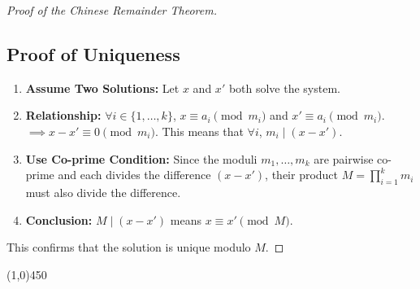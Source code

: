 \begin{proof}[Proof of the Chinese Remainder Theorem]
\subsection*{Proof of Uniqueness}
\begin{enumerate}
    \item \textbf{Assume Two Solutions:} Let $x$ and $x'$ both solve the system.
    \item \textbf{Relationship:} $\forall i \in \{1, \dots, k\}$, $x \equiv a_i \pmod{m_i}$ and $x' \equiv a_i \pmod{m_i}$. $\implies x - x' \equiv 0 \pmod{m_i}$.
    This means that $\forall i$, $m_i \mid (x - x')$.
    \item \textbf{Use Co-prime Condition:} Since the moduli $m_1, \dots, m_k$ are pairwise co-prime and each divides the difference $(x - x')$, their product $M = \prod_{i=1}^{k} m_i$ must also divide the difference.
    \item \textbf{Conclusion:} $M \mid (x - x')$ means $x \equiv x' \pmod{M}$.
\end{enumerate}
This confirms that the solution is unique modulo $M$. \qedhere
\end{proof}

\begin{center}
    \line(1,0){450}
\end{center}